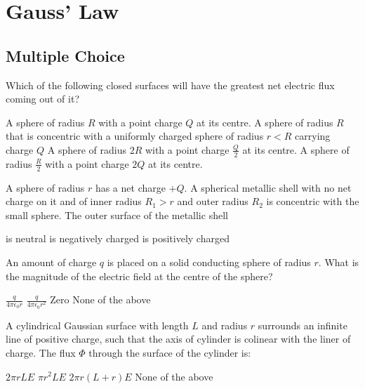 \section{Gauss' Law}

\subsection{Multiple Choice}


\question Which of the following closed surfaces will have the greatest net electric flux coming out of it?
\begin{checkboxes}
\choice A sphere of radius $R$ with a point charge $Q$ at its centre.
\choice A sphere of radius $R$ that is concentric with a uniformly charged sphere of radius $r<R$ carrying charge $Q$
\choice A sphere of radius $2R$ with a point charge $\frac{Q}{2}$ at its centre.
\CorrectChoice A sphere of radius $\frac{R}{2}$ with a point charge $2Q$ at its centre. \correct
\end{checkboxes}


\question A sphere of radius $r$ has a net charge $+Q$. A spherical metallic shell with no net charge on it and of inner radius $R_1>r$ and outer radius $R_2$ is concentric with the small sphere. The outer surface of the metallic shell
\begin{checkboxes}
\choice is neutral
\choice is negatively charged
\CorrectChoice is positively charged \correct
\end{checkboxes}



\question An amount of charge $q$ is placed on a solid conducting sphere of radius $r$. What is the magnitude of the electric field at the centre of the sphere?
\begin{checkboxes}
\choice $\frac{q}{4\pi\epsilon_0 r}$
\choice $\frac{q}{4\pi\epsilon_0 r^2}$
\CorrectChoice Zero \correct
\choice None of the above
\end{checkboxes}

\question A cylindrical Gaussian surface with length $L$ and radius $r$ surrounds an infinite line of positive charge, such that the axis of cylinder is colinear with the liner of charge. The flux $\Phi$ through the surface of the cylinder is:
\begin{checkboxes}
\CorrectChoice $2\pi rLE$ \correct
\choice $\pi r^2LE$
\choice $2\pi r(L+r)E$
\choice None of the above
\end{checkboxes}

